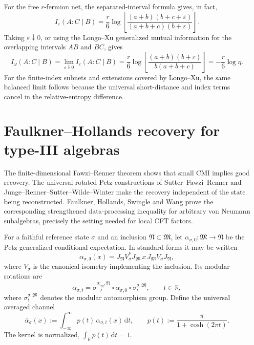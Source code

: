 \documentclass[11pt]{article}
\theoremstyle{accenttheorem}
\theoremstyle{definition}
\newcommand{\cM}{\mathfrak{M}}
\newcommand{\cN}{\mathfrak{N}}
\newcommand{\CMI}{I}
\newcommand{\eps}{\varepsilon}
\newcommand{\dd}{\,\mathrm{d}}
\newcommand{\1}{\mathbf{1}}
\begin{document}
For the free \(r\)-fermion net, the separated-interval formula gives, in fact,
\begin{equation}\label{eq:Ieps-free}
 \CMI_\eps(A:C\mid B)
 =\frac r6\log\!\left[
   \frac{(a+b)(b+c+\eps)}{(a+b+c)(b+\eps)}
 \right].
\end{equation}
Taking \(\eps\downarrow0\), or using the Longo--Xu generalized mutual information for the overlapping intervals \(AB\) and \(BC\), gives
\begin{equation}\label{eq:longoxu-limit}
 \CMI_\omega(A:C\mid B)
 =\lim_{\eps\downarrow0}\CMI_\eps(A:C\mid B)
 =\frac r6\log\!\left[
   \frac{(a+b)(b+c)}{b(a+b+c)}
 \right]
 =-\frac r6\log\eta.
\end{equation}
For the finite-index subnets and extensions covered by Longo--Xu, the same balanced limit follows because the universal short-distance and index terms cancel in the relative-entropy difference.

\section{Faulkner--Hollands recovery for type-III algebras}

The finite-dimensional Fawzi--Renner theorem shows that small CMI implies good recovery.  The universal rotated-Petz constructions of Sutter--Fawzi--Renner and Junge--Renner--Sutter--Wilde--Winter make the recovery independent of the state being reconstructed.  Faulkner, Hollands, Swingle and Wang prove the corresponding strengthened data-processing inequality for arbitrary von Neumann subalgebras, precisely the setting needed for local CFT factors.

For a faithful reference state \(\sigma\) and an inclusion \(\cN\subset\cM\), let
\(\alpha_{\sigma,0}:\cM\to\cN\) be the Petz generalized conditional expectation.  In standard forms it may be written
\begin{equation}\label{eq:standard-petz}
 \alpha_{\sigma,0}(x)
 =J_{\cN}V_\sigma^*J_{\cM}\,x\,J_{\cM}V_\sigma J_{\cN},
\end{equation}
where \(V_\sigma\) is the canonical isometry implementing the inclusion.  Its modular rotations are
\begin{equation}\label{eq:rotated-petz}
 \alpha_{\sigma,t}
 =\sigma_{-t}^{\sigma|_{\cN},\cN}
  \circ\alpha_{\sigma,0}
  \circ\sigma_t^{\sigma,\cM},
 \qquad t\in\mathbb R,
\end{equation}
where \(\sigma_t^{\sigma,\cM}\) denotes the modular automorphism group.  Define the universal averaged channel
\begin{equation}\label{eq:averaged-petz}
 \overline\alpha_\sigma(x)
 :=\int_{-\infty}^{\infty}
    p(t)\,\alpha_{\sigma,t}(x)\dd t,
 \qquad
 p(t):=\frac{\pi}{1+\cosh(2\pi t)}.
\end{equation}
The kernel is normalized, \(\int_{\mathbb R}p(t)\dd t=1\).
\end{document}
